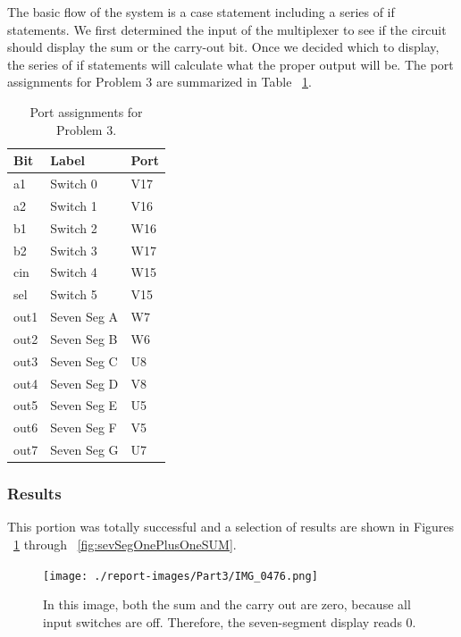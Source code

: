 \documentclass[11pt]{article}
\begin{document}
The basic flow of the system is a case statement including a series of if statements. We first determined  the input of the multiplexer to see if the circuit should display the sum or the carry-out bit. Once we decided which to display, the series of if statements will calculate what the proper output will be. The port assignments for Problem 3 are summarized in Table ~\ref{tab:sevSegPortMap}.

\begin{table}[H]
\begin{center}
	\begin{tabular}{| l | l | l |}
		\hline
		Bit & Label & Port \\ \hline
		a1 & Switch 0 & V17 \\ \hline
		a2 & Switch 1 & V16 \\ \hline
		b1 & Switch 2 & W16 \\ \hline
		b2 & Switch 3 & W17 \\ \hline
		cin & Switch 4 & W15 \\ \hline
		sel & Switch 5 & V15 \\ \hline
		out1 & Seven Seg A & W7 \\ \hline
		out2 & Seven Seg B & W6 \\ \hline
		out3 & Seven Seg C & U8 \\ \hline
		out4 & Seven Seg D & V8 \\ \hline
		out5 & Seven Seg E & U5 \\ \hline
		out6 & Seven Seg F & V5 \\ \hline
		out7 & Seven Seg G & U7 \\ \hline
	\end{tabular}
	\caption{\label{tab:sevSegPortMap}Port assignments for Problem 3.}
\end{center}
\end{table}

\subsubsection{Results}
This portion was totally successful and a selection of results are shown in Figures ~\ref{fig:sevSegAllOff} through ~\ref{fig:sevSegOnePlusOneSUM}.

\begin{figure}[H]
\begin{center}
	\texttt{[image: ./report-images/Part3/IMG\_0476.png]}
	\caption{\label{fig:sevSegAllOff}In this image, both the sum and the carry out are zero, because all input switches are off. Therefore, the seven-segment display reads 0.}
\end{center}
\end{figure}
\end{document}
